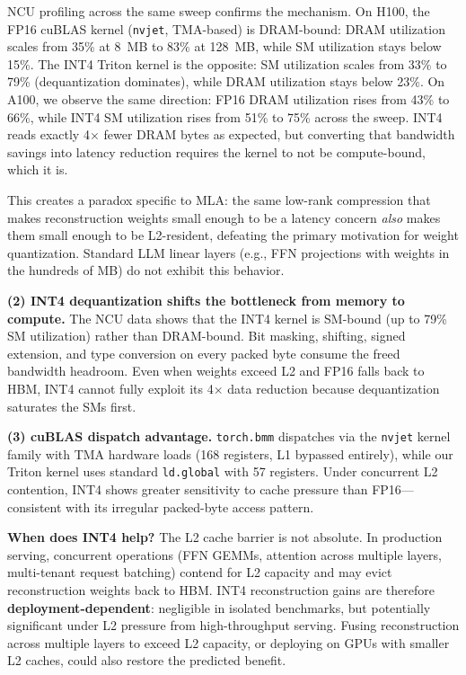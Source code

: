 \documentclass[10pt,twocolumn]{article}
\begin{document}
NCU profiling across the same sweep confirms the mechanism.  On H100, the FP16 cuBLAS kernel (\texttt{nvjet}, TMA-based) is DRAM-bound: DRAM utilization scales from 35\% at 8~MB to 83\% at 128~MB, while SM utilization stays below 15\%.  The INT4 Triton kernel is the opposite: SM utilization scales from 33\% to 79\% (dequantization dominates), while DRAM utilization stays below 23\%.  On A100, we observe the same direction: FP16 DRAM utilization rises from 43\% to 66\%, while INT4 SM utilization rises from 51\% to 75\% across the sweep.  INT4 reads exactly 4$\times$ fewer DRAM bytes as expected, but converting that bandwidth savings into latency reduction requires the kernel to not be compute-bound, which it is.

This creates a paradox specific to MLA: the same low-rank compression that makes reconstruction weights small enough to be a latency concern \emph{also} makes them small enough to be L2-resident, defeating the primary motivation for weight quantization.  Standard LLM linear layers (e.g., FFN projections with weights in the hundreds of MB) do not exhibit this behavior.

\textbf{(2) INT4 dequantization shifts the bottleneck from memory to compute.}  The NCU data shows that the INT4 kernel is SM-bound (up to 79\% SM utilization) rather than DRAM-bound.  Bit masking, shifting, signed extension, and type conversion on every packed byte consume the freed bandwidth headroom.  Even when weights exceed L2 and FP16 falls back to HBM, INT4 cannot fully exploit its 4$\times$ data reduction because dequantization saturates the SMs first.

\textbf{(3) cuBLAS dispatch advantage.}  \texttt{torch.bmm} dispatches via the \texttt{nvjet} kernel family with TMA hardware loads (168 registers, L1 bypassed entirely), while our Triton kernel uses standard \texttt{ld.global} with 57 registers.  Under concurrent L2 contention, INT4 shows greater sensitivity to cache pressure than FP16---consistent with its irregular packed-byte access pattern.

\textbf{When does INT4 help?}  The L2 cache barrier is not absolute.  In production serving, concurrent operations (FFN GEMMs, attention across multiple layers, multi-tenant request batching) contend for L2 capacity and may evict reconstruction weights back to HBM.  INT4 reconstruction gains are therefore \textbf{deployment-dependent}: negligible in isolated benchmarks, but potentially significant under L2 pressure from high-throughput serving.  Fusing reconstruction across multiple layers to exceed L2 capacity, or deploying on GPUs with smaller L2 caches, could also restore the predicted benefit.
\end{document}
